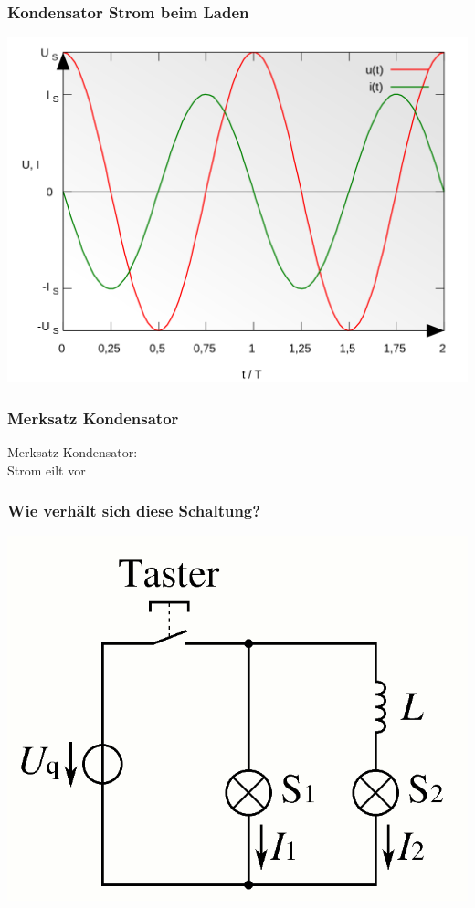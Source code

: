 \begin{frame}
  \frametitle{Kondensator Strom beim Laden}
  \begin{center}
    \includegraphics[width=1\textwidth,height=.85\textheight,keepaspectratio]{a03/Sinus_Voltage_and_Current_of_a_Capacitor.png}
    \tiny \hyperlink{refs}{\cite{wc}}
  \end{center}
\end{frame}

\begin{frame}
  \frametitle{Merksatz Kondensator}
  \begin{block}{Merksatz}
    Kondensator:\\
    Strom eilt vor
  \end{block}
\end{frame}

\begin{frame}
  \frametitle{Wie verhält sich diese Schaltung?}
  \begin{center}
    \includegraphics[width=.8\textwidth,height=.85\textheight,keepaspectratio]{a03/Spulenstrom.png}
    \tiny \hyperlink{refs}{\cite{wc}}
  \end{center}
\end{frame}

